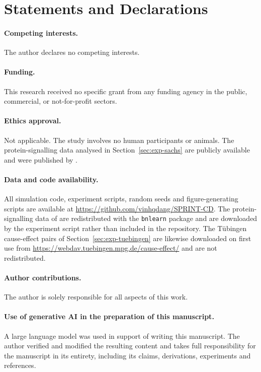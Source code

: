 \backmatter

\section*{Statements and Declarations}\label{sec:declarations}

\paragraph{Competing interests.} The author declares no competing interests.

\paragraph{Funding.} This research received no specific grant from any funding
agency in the public, commercial, or not-for-profit sectors.

\paragraph{Ethics approval.} Not applicable. The study involves no human
participants or animals. The protein-signalling data analysed in
Section~\ref{sec:exp-sachs} are publicly available and were published by
\citet{sachs2005causal}.

\paragraph{Data and code availability.}\label{sec:availability} All
simulation code, experiment scripts, random seeds and figure-generating
scripts are available at
\url{https://github.com/vinhqdang/SPRINT-CD}. The protein-signalling data of
\citet{sachs2005causal} are redistributed with the \texttt{bnlearn} package
\citep{scutari2010learning} and are downloaded by the experiment script rather
than included in the repository. The Tübingen cause-effect pairs of
Section~\ref{sec:exp-tuebingen} are likewise downloaded on first use from
\url{https://webdav.tuebingen.mpg.de/cause-effect/} and are not redistributed.

\paragraph{Author contributions.} The author is solely responsible for all
aspects of this work.

\paragraph{Use of generative AI in the preparation of this manuscript.} A
large language model was used in support of writing this manuscript. The
author verified and modified the resulting content and takes full
responsibility for the manuscript in its entirety, including its claims,
derivations, experiments and references.
